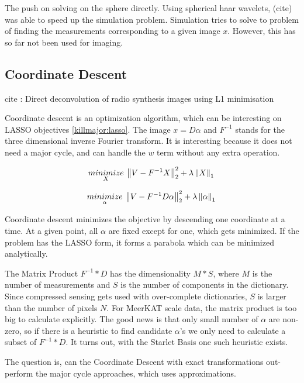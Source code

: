 The push on solving on the sphere directly. Using spherical haar wavelets, (cite) was able to speed up the simulation problem. Simulation tries to solve to problem of finding the measurements corresponding to a given image $x$. However, this has so far not been used for imaging.


\subsection{Coordinate Descent}

cite : Direct deconvolution of radio synthesis images using L1 minimisation

Coordinate descent is an optimization algorithm, which can be interesting on LASSO objectives \eqref{killmajor:lasso}. The image $x = D\alpha$ and $F^{-1}$ stands for the three dimensional inverse Fourier transform. It is interesting because it does not need a major cycle, and can handle the $w$ term without any extra operation.


\begin{equation}\label{killmajor:lasso}
\underset{X}{minimize} \: \left \| V - F^{-1}X \right \|_2^2 + \lambda \left \| X \right \|_1 \\
\end{equation}

\begin{equation}
\underset{\alpha}{minimize} \: \left \| V - F^{-1}D \alpha \right \|_2^2 + \lambda \left \| \alpha \right \|_1 \\
\end{equation}

Coordinate descent minimizes the objective by descending one coordinate at a time. At a given point, all $\alpha$ are fixed except for one, which gets minimized. If the problem has the LASSO form, it forms a parabola which can be minimized analytically.

The Matrix Product $F^{-1}*D$ has the dimensionality $M*S$, where $M$ is the number of measurements and $S$ is the number of components in the dictionary. Since compressed sensing gets used with over-complete dictionaries, $S$ is larger than the number of pixels $N$. For MeerKAT scale data, the matrix product is too big to calculate explicitly.  The good news is that only small number of $\alpha$ are non-zero, so if there is a heuristic to find candidate $\alpha$'s we only need to calculate a subset of $F^{-1}*D$. It turns out, with the Starlet Basis one such heuristic exists.

The question is, can the Coordinate Descent with exact transformations out-perform the major cycle approaches, which uses approximations.


